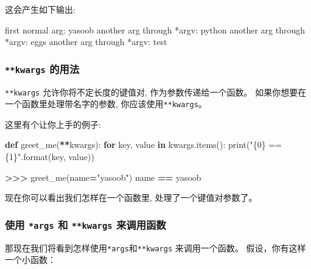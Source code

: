 \documentclass[]{ctexbook}
\newenvironment{Shaded}{\begin{snugshade}}{\end{snugshade}}
\newcommand{\BuiltInTok}[1]{#1}
\newcommand{\ControlFlowTok}[1]{\textcolor[rgb]{0.13,0.29,0.53}{\textbf{#1}}}
\newcommand{\ExtensionTok}[1]{#1}
\newcommand{\KeywordTok}[1]{\textcolor[rgb]{0.13,0.29,0.53}{\textbf{#1}}}
\newcommand{\NormalTok}[1]{#1}
\newcommand{\OperatorTok}[1]{\textcolor[rgb]{0.81,0.36,0.00}{\textbf{#1}}}
\newcommand{\SpecialCharTok}[1]{\textcolor[rgb]{0.00,0.00,0.00}{#1}}
\newcommand{\StringTok}[1]{\textcolor[rgb]{0.31,0.60,0.02}{#1}}
\begin{document}
这会产生如下输出:

\begin{Shaded}
\begin{Highlighting}[]
\ExtensionTok{first}\NormalTok{ normal arg: yasoob}
\ExtensionTok{another}\NormalTok{ arg through *argv: python}
\ExtensionTok{another}\NormalTok{ arg through *argv: eggs}
\ExtensionTok{another}\NormalTok{ arg through *argv: test}
\end{Highlighting}
\end{Shaded}

\hypertarget{kwargs-ux7684ux7528ux6cd5}{%
\subsubsection{\texorpdfstring{\texttt{**kwargs} 的用法}{**kwargs 的用法}}\label{kwargs-ux7684ux7528ux6cd5}}

\texttt{**kwargs} 允许你将不定长度的键值对, 作为参数传递给一个函数。 如果你想要在一个函数里处理带名字的参数, 你应该使用\texttt{**kwargs}。

这里有个让你上手的例子:

\begin{Shaded}
\begin{Highlighting}[]
\KeywordTok{def}\NormalTok{ greet_me(}\OperatorTok{**}\NormalTok{kwargs):}
    \ControlFlowTok{for}\NormalTok{ key, value }\KeywordTok{in}\NormalTok{ kwargs.items():}
        \BuiltInTok{print}\NormalTok{(}\StringTok{"}\SpecialCharTok{\{0\}}\StringTok{ == }\SpecialCharTok{\{1\}}\StringTok{"}\NormalTok{.}\BuiltInTok{format}\NormalTok{(key, value))}


\OperatorTok{>>>}\NormalTok{ greet_me(name}\OperatorTok{=}\StringTok{"yasoob"}\NormalTok{)}
\NormalTok{name }\OperatorTok{==}\NormalTok{ yasoob}
\end{Highlighting}
\end{Shaded}

现在你可以看出我们怎样在一个函数里, 处理了一个键值对参数了。

\hypertarget{ux4f7fux7528-args-ux548c-kwargs-ux6765ux8c03ux7528ux51fdux6570}{%
\subsubsection{\texorpdfstring{使用 \texttt{*args} 和 \texttt{**kwargs} 来调用函数}{使用 *args 和 **kwargs 来调用函数}}\label{ux4f7fux7528-args-ux548c-kwargs-ux6765ux8c03ux7528ux51fdux6570}}

那现在我们将看到怎样使用\texttt{*args}和\texttt{**kwargs} 来调用一个函数。 假设，你有这样一个小函数：
\end{document}
